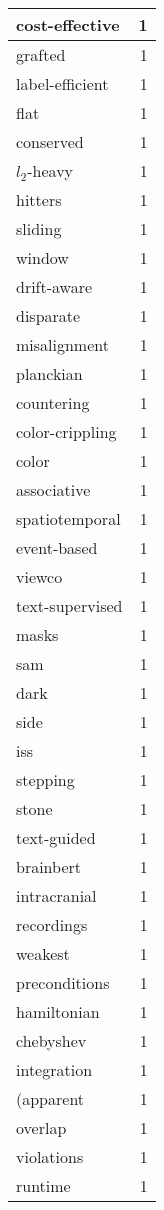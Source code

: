 \begin{table}[h]
\begin{tabular}{|l|r|}
\hline
cost-effective & 1 \\
\hline
grafted & 1 \\
\hline
label-efficient & 1 \\
\hline
flat & 1 \\
\hline
conserved & 1 \\
\hline
$l_2$-heavy & 1 \\
\hline
hitters & 1 \\
\hline
sliding & 1 \\
\hline
window & 1 \\
\hline
drift-aware & 1 \\
\hline
disparate & 1 \\
\hline
misalignment & 1 \\
\hline
planckian & 1 \\
\hline
countering & 1 \\
\hline
color-crippling & 1 \\
\hline
color & 1 \\
\hline
associative & 1 \\
\hline
spatiotemporal & 1 \\
\hline
event-based & 1 \\
\hline
viewco & 1 \\
\hline
text-supervised & 1 \\
\hline
masks & 1 \\
\hline
sam & 1 \\
\hline
dark & 1 \\
\hline
side & 1 \\
\hline
iss & 1 \\
\hline
stepping & 1 \\
\hline
stone & 1 \\
\hline
text-guided & 1 \\
\hline
brainbert & 1 \\
\hline
intracranial & 1 \\
\hline
recordings & 1 \\
\hline
weakest & 1 \\
\hline
preconditions & 1 \\
\hline
hamiltonian & 1 \\
\hline
chebyshev & 1 \\
\hline
integration & 1 \\
\hline
(apparent & 1 \\
\hline
overlap & 1 \\
\hline
violations & 1 \\
\hline
runtime & 1 \\

\end{tabular}
\end{table}
